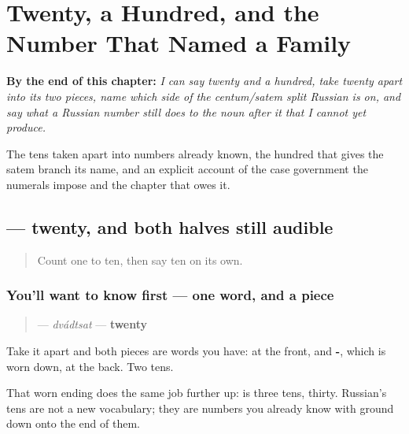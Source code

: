 
\chapter{Twenty, a Hundred, and the Number That Named a Family}
\label{ch:ru-round-amounts}

\begin{chapteropening}
\textbf{By the end of this chapter:} \emph{I can say twenty and a hundred, take twenty apart into its two pieces, name which side of the centum/satem split Russian is on, and say what a Russian number still does to the noun after it that I cannot yet produce.}

The tens taken apart into numbers already known, the hundred that gives the satem branch its name, and an explicit account of the case government the numerals impose and the chapter that owes it.
\end{chapteropening}

\section[\texorpdfstring{\ru{двадцать} (dvádtsat)}{двадцать (dvádtsat)}]{ — twenty, and both halves still audible}

\label{lesson:RU-C25-dvadtsat}



\begin{quote}
Count one to ten, then say ten on its own.
\end{quote}

\subsection*{You'll want to know first — one word, and a piece}
\begin{quote}
\textbf{} — \emph{dvádtsat} — \textbf{twenty}
\end{quote}

Take it apart and both pieces are words you have: \textbf{} at the front, and \textbf{-}, which is \textbf{} worn down, at the back. Two tens.

That worn ending does the same job further up: \textbf{} is three tens, thirty. Russian's tens are not a new vocabulary; they are numbers you already know with \textbf{} ground down onto the end of them.

